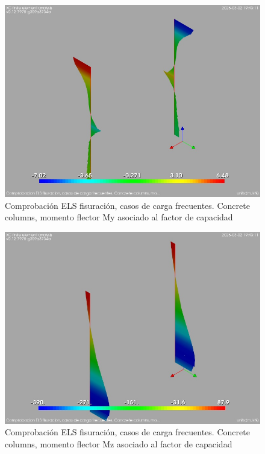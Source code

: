 \begin{figure}[ht]
\begin{center}
\includegraphics[width=\linewidth]{results/graphics/crackingSLS_freq/columnZconcrMy}
\caption{Comprobación ELS fisuración, casos de carga frecuentes. Concrete columns, momento flector My asociado al factor de capacidad}
\label{SLS_frequentLoadsCrackControlcolumnZconcrMy}
\end{center}
\end{figure}
\begin{figure}[ht]
\begin{center}
\includegraphics[width=\linewidth]{results/graphics/crackingSLS_freq/columnZconcrMz}
\caption{Comprobación ELS fisuración, casos de carga frecuentes. Concrete columns, momento flector Mz asociado al factor de capacidad}
\label{SLS_frequentLoadsCrackControlcolumnZconcrMz}
\end{center}
\end{figure}
